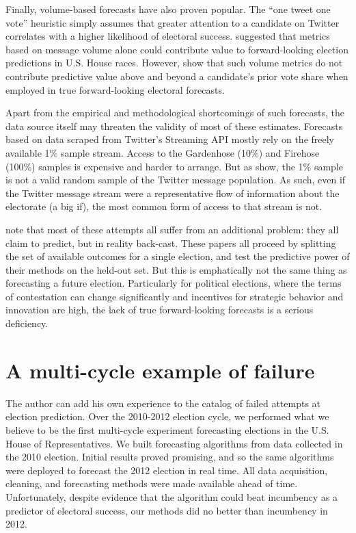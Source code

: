 \documentclass{article}
\begin{document}
Finally, volume-based forecasts have also proven popular. The ``one
tweet one vote'' heuristic simply assumes that greater attention to a
candidate on Twitter correlates with a higher likelihood of electoral
success. \cite{digrazia2013} suggested that metrics based on message
volume alone could contribute value to forward-looking election
predictions in U.S. House races. However, \cite{huberty2013twitter}
show that such volume metrics do not contribute predictive value above
and beyond a candidate's prior vote share when employed in true
forward-looking electoral forecasts.

Apart from the empirical and methodological shortcomings of such
forecasts, the data source itself may threaten the validity of most of
these estimates. Forecasts based on data scraped from Twitter's
Streaming API mostly rely on the freely available 1\% sample
stream. Access to the Gardenhose (10\%) and Firehose (100\%)
samples is expensive and harder to arrange. But as
\cite{morstatter2013sample} show, the 1\% sample is not a valid random
sample of the Twitter message population. As such, even if the Twitter
message stream were a representative flow of information about the
electorate (a big if), the most common form of access to that stream
is not. 

\cite{metaxas2011not} note that most of these attempts all suffer from
an additional problem: they all claim to predict, but in reality
back-cast. These papers all proceed by splitting the set of available
outcomes for a single election, and test the predictive power of their
methods on the held-out set. But this is emphatically not the same
thing as forecasting a future election. Particularly for political
elections, where the terms of contestation can change significantly
and incentives for strategic behavior and innovation are high, the
lack of true forward-looking forecasts is a serious deficiency.


\section{A multi-cycle example of failure}
\label{sec:multi-cycle-example}


The author can add his own experience to the catalog of failed attempts at
election prediction. Over the 2010-2012 election cycle, we performed
what we believe to be the first multi-cycle experiment forecasting
elections in the U.S. House of Representatives. We built forecasting
algorithms from data collected in the 2010 election. Initial results
proved promising, and so the same algorithms were deployed to forecast
the 2012 election in real time. All data acquisition, cleaning, and
forecasting methods were made available ahead of time. Unfortunately,
despite evidence that the algorithm could beat incumbency as a
predictor of electoral success, our methods did no better than
incumbency in 2012.
\end{document}

